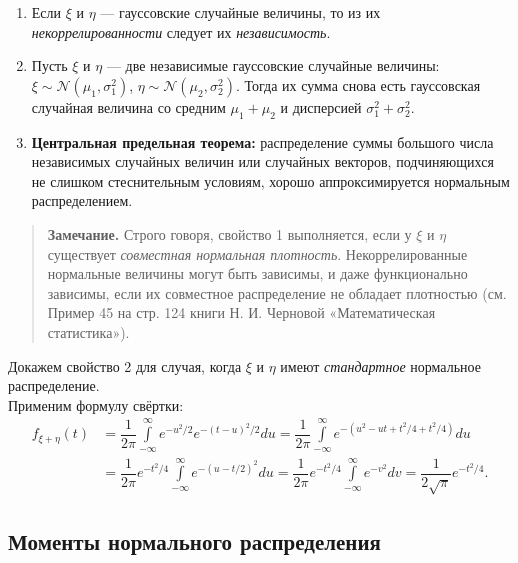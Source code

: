 \documentclass[11pt,a4paper]{article}
\begin{document}
\begin{enumerate}
\def\labelenumi{\arabic{enumi}.}
\item
  Если \(\xi\) и \(\eta\) --- гауссовские случайные величины, то из их
  \emph{некоррелированности} следует их \emph{независимость}.
\item
  Пусть \(\xi\) и \(\eta\) --- две независимые гауссовские случайные
  величины: \(\xi \sim \mathcal{N}\left( \mu_1, \sigma_1^2 \right)\),
  \(\eta \sim \mathcal{N}\left( \mu_2, \sigma_2^2 \right)\). Тогда их
  сумма снова есть гауссовская случайная величина со средним
  \(\mu_1 + \mu_2\) и дисперсией \(\sigma_1^2 + \sigma_2^2\).
\item
  \textbf{Центральная предельная теорема:} распределение суммы большого
  числа независимых случайных величин или случайных векторов,
  подчиняющихся не слишком стеснительным условиям, хорошо
  аппроксимируется нормальным распределением.
\end{enumerate}

\begin{quote}
\textbf{Замечание.} Строго говоря, свойство 1 выполняется, если у
\(\xi\) и \(\eta\) существует \emph{совместная нормальная плотность}.
Некоррелированные нормальные величины могут быть зависимы, и даже
функционально зависимы, если их совместное распределение не обладает
плотностью (см. Пример 45 на стр. 124 книги Н. И. Черновой
«Математическая статистика»).
\end{quote}

    Докажем свойство 2 для случая, когда \(\xi\) и \(\eta\) имеют
\emph{стандартное} нормальное распределение.\\
Применим формулу свёртки: \[
\begin{split}
  f_{\xi+\eta}(t)
  &= \dfrac{1}{2\pi} \int\limits_{-\infty}^{\infty} e^{-{u^2}/{2}} e^{-{(t-u)^2}/{2}} du
  = \dfrac{1}{2\pi} \int\limits_{-\infty}^{\infty} e^{-\left( u^2 - ut + t^2/4 + t^2/4 \right)} du \\
  &= \dfrac{1}{2\pi} e^{-t^2/4} \int\limits_{-\infty}^{\infty} e^{-\left( u - t/2 \right)^2} du
  = \dfrac{1}{2\pi} e^{-t^2/4} \int\limits_{-\infty}^{\infty} e^{-v^2}dv
  = \dfrac{1}{2\sqrt{\pi}} e^{-t^2/4}.
\end{split}
\]

    \hypertarget{ux43cux43eux43cux435ux43dux442ux44b-ux43dux43eux440ux43cux430ux43bux44cux43dux43eux433ux43e-ux440ux430ux441ux43fux440ux435ux434ux435ux43bux435ux43dux438ux44f}{%
\subsection{Моменты нормального
распределения}\label{ux43cux43eux43cux435ux43dux442ux44b-ux43dux43eux440ux43cux430ux43bux44cux43dux43eux433ux43e-ux440ux430ux441ux43fux440ux435ux434ux435ux43bux435ux43dux438ux44f}}
\end{document}

